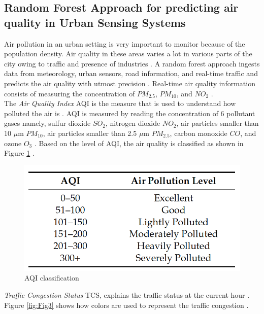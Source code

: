 \documentclass[sigconf]{acmart}
\begin{document}
\subsection{Random Forest Approach for predicting air quality in Urban Sensing Systems}
Air pollution in an urban setting is very important to monitor because of the population density. Air quality in these areas varies a lot in various parts of the city owing to traffic and presence of industries \cite{raq2016}. A random forest approach ingests data from meteorology, urban sensors, road information, and real-time traffic and predicts the air quality with utmost precision \cite{raq2016}. Real-time air quality information consists of measuring the concentration of $PM_{2.5}$, $PM_{10}$, and $NO_{2}$ \cite{raq2016}. \\
The {\em Air Quality Index} AQI is the measure that is used to understand how polluted the air is \cite{raq2016}. AQI is measured by reading the concentration of 6 pollutant gases namely, sulfur dioxide $SO_{2}$, nitrogen dioxide $NO_{2}$, air particles smaller than 10 $\mu$m $PM_{10}$, air particles smaller than 2.5 $\mu$m $PM_{2.5}$, carbon monoxide $CO$, and ozone $O_3$ \cite{raq2016}. Based on the level of AQI, the air quality is classified as shown in Figure \ref{fig:Fig2} \cite{raq2016}. 

\begin{figure}
\includegraphics[width=1.0\textwidth]{images/fig2.png}
\caption{AQI classification \cite{raq2016}}
\label{fig:Fig2}
\end{figure}

{\em Traffic Congestion Status} TCS, explains the traffic status at the current hour \cite{raq2016}. Figure \ref{fig:Fig3} shows how colors are used to represent the traffic congestion \cite{raq2016}.
\end{document}
